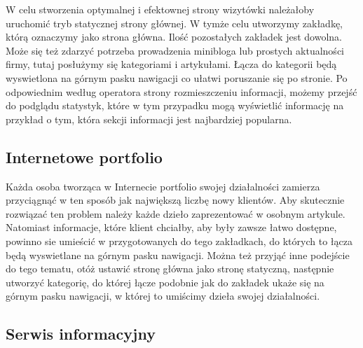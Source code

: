 \documentclass[openright]{xmgr}
\begin{document}
W celu stworzenia optymalnej i efektownej strony wizytówki należałoby uruchomić tryb statycznej strony głównej. W tymże celu utworzymy zakładkę, którą oznaczymy jako strona główna. Ilość pozostałych zakładek jest dowolna. Może się też zdarzyć potrzeba prowadzenia minibloga lub prostych aktualności firmy, tutaj posłużymy się kategoriami i artykułami. Łącza do kategorii będą wyswietlona na górnym pasku nawigacji co ułatwi poruszanie się po stronie.  Po odpowiednim według operatora strony rozmieszczeniu informacji, możemy przejść do podglądu statystyk, które w tym przypadku mogą wyświetlić informację na przykład o tym, która sekcji informacji jest najbardziej popularna. 

\subsection{Internetowe portfolio}

Każda osoba tworząca w Internecie portfolio swojej działalności zamierza przyciągnąć w ten sposób jak największą liczbę nowy klientów. Aby skutecznie rozwiązać ten problem należy każde dzieło zaprezentować w osobnym artykule. Natomiast informacje, które klient chciałby, aby były zawsze łatwo dostępne, powinno sie umieścić w przygotowanych do tego zakładkach, do których to łącza będą wyswietlane na górnym pasku nawigacji. Można też przyjąć inne podejście do tego tematu, otóż ustawić stronę główna jako stronę statyczną, następnie utworzyć kategorię, do której łącze podobnie jak do zakładek ukaże się na górnym pasku nawigacji, w której to umiścimy dzieła swojej działalności. 

\subsection{Serwis informacyjny}
\end{document}
